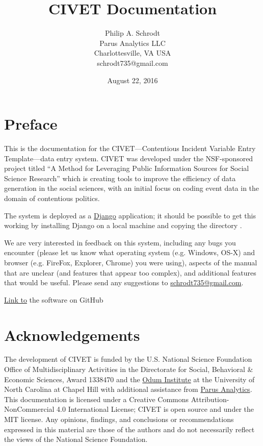 \documentclass[letterpaper,10pt,english]{sphinxmanual}
\title{CIVET Documentation}
\date{August 22, 2016}
\author{Philip A. Schrodt\\Parus Analytics LLC\\Charlottesville, VA USA\\schrodt735@gmail.com}
\begin{document}
\maketitle
\tableofcontents
{}\label{index::doc}\section*{Preface}
This is the documentation for the CIVET—Contentious Incident Variable Entry Template—data entry system.
CIVET was developed under the NSF-sponsored project titled “A Method for Leveraging Public Information
Sources for Social Science Research” which is creating tools to improve the efficiency of data generation
in the social sciences, with an initial focus on coding event data in the domain of contentious politics.

The system is deployed as a \href{https://www.djangoproject.com/start/overview/}{Django} application;
it should be possible to get this working by installing Django on a local machine and copying the directory .

We are very interested in feedback on this system, including any bugs
you encounter (please let us know what operating system (e.g. Windows,
OS-X) and browser (e.g. FireFox, Explorer, Chrome) you were using),
aspects of the manual that are unclear (and features that appear too
complex), and additional features that would be useful. Please send any
suggestions to \href{mailto:schrodt735@gmail.com}{schrodt735@gmail.com}.

\href{https://github.com/civet-software}{Link to} the software on GitHub
\section*{Acknowledgements}
The development of CIVET is funded by the U.S. National Science Foundation Office of Multidisciplinary Activities
in the Directorate for Social, Behavioral \& Economic Sciences, Award 1338470 and the \href{http://www.odum.unc.edu/odum/home2.jsp}{Odum Institute} at the University of North Carolina at Chapel Hill with additional assistance from \href{http://parusanalytics.com/}{Parus Analytics}. This documentation is licensed under a Creative Commons Attribution-NonCommercial 4.0 International License; CIVET is open source and under the MIT license.
Any opinions, findings, and conclusions or recommendations expressed in this material are those of the authors
and do not necessarily reflect the views of the National Science Foundation.
\end{document}
